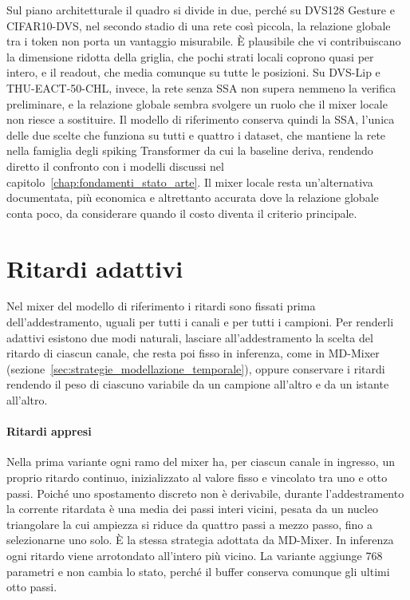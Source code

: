 Sul piano architetturale il quadro si divide in due, perché su DVS128 Gesture e CIFAR10-DVS, nel secondo stadio di una rete così piccola, la relazione globale tra i token non porta un vantaggio misurabile. È plausibile che vi contribuiscano la dimensione ridotta della griglia, che pochi strati locali coprono quasi per intero, e il readout, che media comunque su tutte le posizioni. Su DVS-Lip e THU-EACT-50-CHL, invece, la rete senza SSA non supera nemmeno la verifica preliminare, e la relazione globale sembra svolgere un ruolo che il mixer locale non riesce a sostituire. Il modello di riferimento conserva quindi la SSA, l'unica delle due scelte che funziona su tutti e quattro i dataset, che mantiene la rete nella famiglia degli spiking Transformer da cui la baseline deriva, rendendo diretto il confronto con i modelli discussi nel capitolo~\ref{chap:fondamenti_stato_arte}. Il mixer locale resta un'alternativa documentata, più economica e altrettanto accurata dove la relazione globale conta poco, da considerare quando il costo diventa il criterio principale.



\section{Ritardi adattivi}
\label{sec:ritardi_adattivi}

Nel mixer del modello di riferimento i ritardi sono fissati prima dell'addestramento, uguali per tutti i canali e per tutti i campioni. Per renderli adattivi esistono due modi naturali, lasciare all'addestramento la scelta del ritardo di ciascun canale, che resta poi fisso in inferenza, come in MD-Mixer (sezione~\ref{sec:strategie_modellazione_temporale}), oppure conservare i ritardi rendendo il peso di ciascuno variabile da un campione all'altro e da un istante all'altro.

\paragraph{Ritardi appresi}
Nella prima variante ogni ramo del mixer ha, per ciascun canale in ingresso, un proprio ritardo continuo, inizializzato al valore fisso e vincolato tra uno e otto passi. Poiché uno spostamento discreto non è derivabile, durante l'addestramento la corrente ritardata è una media dei passi interi vicini, pesata da un nucleo triangolare la cui ampiezza si riduce da quattro passi a mezzo passo, fino a selezionarne uno solo. È la stessa strategia adottata da MD-Mixer. In inferenza ogni ritardo viene arrotondato all'intero più vicino. La variante aggiunge 768 parametri e non cambia lo stato, perché il buffer conserva comunque gli ultimi otto passi.

